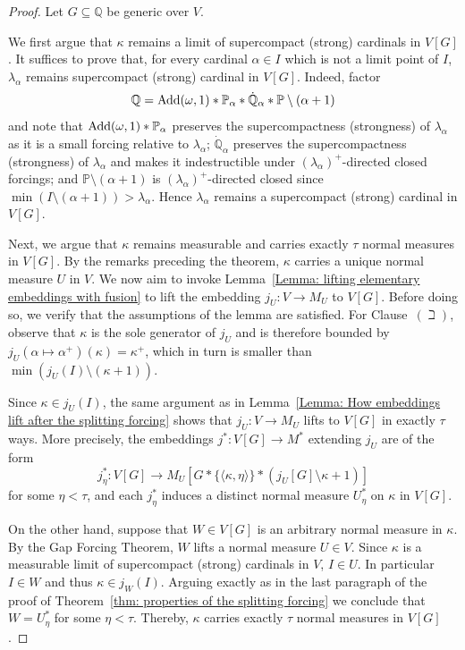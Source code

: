 \documentclass[11pt]{amsart}
\theoremstyle{definition}
\theoremstyle{remark}
\newcommand\<{{<}}
\newcommand{\po}{\mathbb{P}}
\newcommand{\qo}{\mathbb{Q}}
\begin{document}
\begin{proof}
    Let $G\subseteq \qo$ be generic over $V$. 

    We first argue that $\kappa$ remains a limit of supercompact (strong) cardinals in $V[G]$. It suffices to prove that, for every cardinal $\alpha\in I$ which is not a limit point of $I$, $\lambda_\alpha$ remains supercompact (strong) cardinal in $V[G]$. Indeed, factor
    $$\qo = {\rm{Add}}(\omega,1) \ast \mathbb{P}_{\alpha} \ast \dot{\qo}_\alpha\ast  \mathbb{P}\setminus (\alpha+1)$$
    and note that ${\rm{Add}}(\omega,1) \ast \mathbb{P}_{\alpha} $ preserves the supercompactness (strongness) of $\lambda_\alpha$ as it is a small forcing relative to $\lambda_\alpha$; $\dot{\qo}_\alpha$ preserves the supercompactness (strongness) of $\lambda_\alpha$ and makes it indestructible under $(\lambda_\alpha)^+$-directed closed forcings; and $\po\setminus (\alpha+1)$ is $(\lambda_\alpha)^+$-directed closed since $\min(I\setminus (\alpha+1)) > \lambda_\alpha$. Hence $\lambda_\alpha$ remains a supercompact (strong) cardinal in $V[G]$.

    Next, we argue that $\kappa$ remains measurable and carries exactly $\tau$ normal measures in $V[G]$. By the remarks preceding the theorem, $\kappa$ carries a unique normal measure $U$ in $V$. We now aim to invoke Lemma~\ref{Lemma: lifting elementary embeddings with fusion} to lift the embedding $j_U\colon V\to M_U$ to $V[G]$. Before doing so, we verify that the assumptions of the lemma are satisfied. For Clause~$(\beth)$, observe that $\kappa$ is the sole generator of $j_U$ and is therefore bounded by $j_U(\alpha\mapsto\alpha^+)(\kappa)=\kappa^+$, which in turn is smaller than $\min(j_U(I)\setminus (\kappa+1))$.
    
    Since $\kappa\in j_U(I)$, the same argument as in Lemma~\ref{Lemma: How embeddings lift after the splitting forcing} shows that $j_U\colon V\to M_U$ lifts to $V[G]$ in exactly $\tau$ ways. More precisely, the embeddings $j^*\colon V[G]\to M^*$ extending $j_U$ are of the form
    $$j^*_\eta\colon V[G]\rightarrow M_U[G\ast \{\langle \kappa,\eta\rangle\}\ast (j_{U}[G]\setminus \kappa+1)]$$
    for some $\eta<\tau$, and each $j^*_\eta$ induces a distinct normal measure $U^*_\eta$ on $\kappa$ in $V[G]$. 

    On the other hand, suppose that $W\in V[G]$ is an arbitrary normal measure in $\kappa$. By the Gap Forcing Theorem, $W$ lifts a normal measure $U\in V$. Since $\kappa$ is a measurable limit of supercompact (strong) cardinals in $V$, $I\in U$. In particular $I\in W$ and thus $\kappa\in j_W(I)$. Arguing exactly as in the last paragraph of the proof of Theorem~\ref{thm: properties of the splitting forcing} we conclude that $W=U^*_\eta$ for some $\eta<\tau$. Thereby, $\kappa$ carries exactly $\tau$ normal measures in $V[G]$.


\end{proof}
\end{document}
